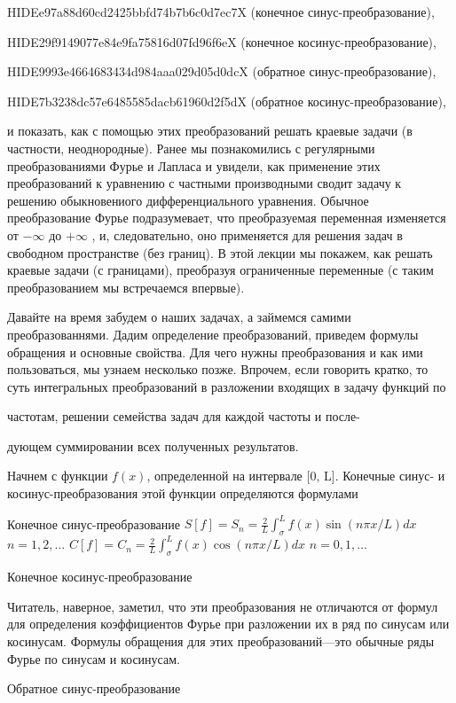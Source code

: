\documentclass[
  ukrainian,
]{article}
\begin{document}
HIDEe97a88d60cd2425bbfd74b7b6c0d7ec7X (конечное синус-преобразование),

HIDE29f9149077e84e9fa75816d07fd96f6eX (конечное косинус-преобразование),

HIDE9993e4664683434d984aaa029d05d0dcX (обратное синус-преобразование),

HIDE7b3238dc57e6485585dacb61960d2f5dX (обратное косинус-преобразование),

и показать, как с помощью этих преобразований решать краевые задачи (в
частности, неоднородные). Ранее мы познакомились с регулярными
преобразованиями Фурье и Лапласа и увидели, как применение этих
преобразований к уравнению с частными производными сводит задачу к
решению обыкновениого дифференциального уравнения. Обычное
преобразование Фурье подразумевает, что преобразуемая переменная
изменяется от \(-\infty\) до \(+\infty\) , и, следовательно, оно
применяется для решения задач в свободном пространстве (без границ). В
этой лекции мы покажем, как решать краевые задачи (с границами),
преобразуя ограниченные переменные (с таким преобразованием мы
встречаемся впервые).

Давайте на время забудем о наших задачах, а займемся самими
преобразованнями. Дадим определение преобразований, приведем формулы
обращения и основные свойства. Для чего нужны преобразования и как ими
пользоваться, мы узнаем несколько позже. Впрочем, если говорить кратко,
то суть интегральных преобразований в разложении входящих в задачу
функций по

частотам, решении семейства задач для каждой частоты и после-

дующем суммировании всех полученных результатов.

Начнем с функции \(f(x)\), определенной на интервале {[}0, L{]}.
Конечные синус- и косинус-преобразования этой функции определяются
формулами

Конечное синус-преобразование
\(S[f] = S_n = \frac{2}{L} \int_{\sigma}^{L} f(x) \sin(n\pi x/L) dx\)
\(n = 1, 2, \dots\)
\(C[f] = C_n = \frac{2}{L} \int_{\sigma}^{L} f(x) \cos(n\pi x/L) dx\)
\(n = 0, 1, \dots\)

Конечное косинус-преобразование

Читатель, наверное, заметил, что эти преобразования не отличаются от
формул для определения коэффициентов Фурье при разложении их в ряд по
синусам или косинусам. Формулы обращения для этих преобразований---это
обычные ряды Фурье по синусам и косинусам.

Обратное синус-преобразование
\end{document}
